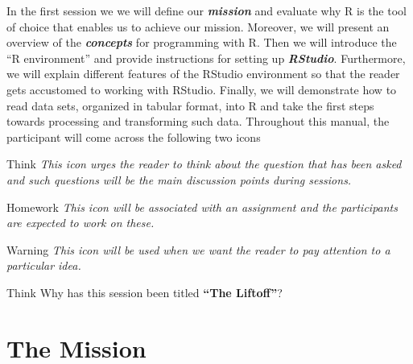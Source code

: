\noindent In the first session we we will define our \textbf{\emph{mission}} and evaluate why R is the tool of choice that enables us to achieve our mission. Moreover, we will present an overview of the \textbf{\emph{concepts}} for programming with R. Then we will introduce the ``R environment'' and provide instructions for setting up \textbf{\emph{RStudio}}. Furthermore, we will explain different features of the RStudio environment so that the reader gets accustomed to working with RStudio. Finally, we will demonstrate how to read data sets, organized in tabular format, into R and take the first steps towards processing and transforming such data.
Throughout this manual, the participant will come across the following two icons

\begin{DIY}{Think}
\emph{This icon urges the reader to think about the question that has been asked and such questions will be the main discussion points during sessions.}
\end{DIY}

\begin{DIY}{Homework}
\emph{This icon will be associated with an assignment and the participants are expected to work on these.}
\end{DIY}

\begin{DIY}{Warning}
\emph{This icon will be used when we want the reader to pay attention to a particular idea.}
\end{DIY}


\vspace{\baselineskip}
\vspace{\baselineskip}
\vspace{\baselineskip}
\begin{DIY}{Think}
Why has this session been titled \textbf{``The Liftoff''}?
\end{DIY}


\clearpage

\section{The Mission}
\begin{HIGHLIGHT}
\par{}
\end{HIGHLIGHT}

